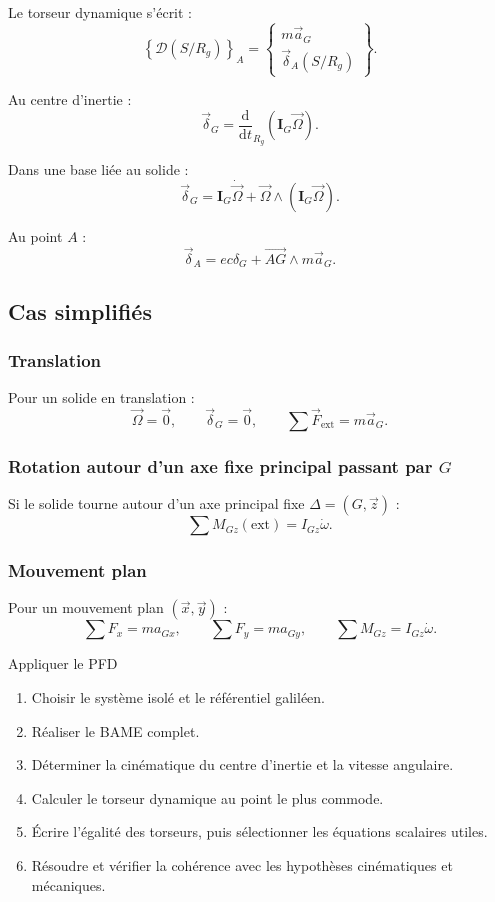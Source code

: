 Le torseur dynamique s'écrit :
\[
\left\{\mathcal D(S/R_g)\right\}_A=
\left\{
\begin{array}{c}
m\vec a_G\\[1mm]
\vec\delta_A(S/R_g)
\end{array}
\right\}.
\]

Au centre d'inertie :
\[
\vec\delta_G=
\frac{\mathrm d}{\mathrm dt}_{R_g}
\left(\mathbf I_G\vec\Omega\right).
\]

Dans une base liée au solide :
\[
\vec\delta_G=\mathbf I_G\dot{\vec\Omega}
+\vec\Omega\wedge\left(\mathbf I_G\vec\Omega\right).
\]

Au point $A$ :
\[
\vec\delta_A=ec\delta_G+\overrightarrow{AG}\wedge m\vec a_G.
\]

\subsection{Cas simplifiés}

\subsubsection{Translation}

Pour un solide en translation :
\[
\vec\Omega=\vec0,
\qquad
\vec\delta_G=\vec0,
\qquad
\sum\vec F_{\mathrm{ext}}=m\vec a_G.
\]

\subsubsection{Rotation autour d'un axe fixe principal passant par $G$}

Si le solide tourne autour d'un axe principal fixe $\Delta=(G,\vec z)$ :
\[
\sum M_{Gz}(\mathrm{ext})=I_{Gz}\dot\omega.
\]

\subsubsection{Mouvement plan}

Pour un mouvement plan $(\vec x,\vec y)$ :
\[
\sum F_x=m a_{Gx},
\qquad
\sum F_y=m a_{Gy},
\qquad
\sum M_{Gz}=I_{Gz}\dot\omega.
\]

\begin{TLMethod}{Appliquer le PFD}
\begin{enumerate}
  \item Choisir le système isolé et le référentiel galiléen.
  \item Réaliser le BAME complet.
  \item Déterminer la cinématique du centre d'inertie et la vitesse angulaire.
  \item Calculer le torseur dynamique au point le plus commode.
  \item Écrire l'égalité des torseurs, puis sélectionner les équations scalaires utiles.
  \item Résoudre et vérifier la cohérence avec les hypothèses cinématiques et mécaniques.
\end{enumerate}
\end{TLMethod}

